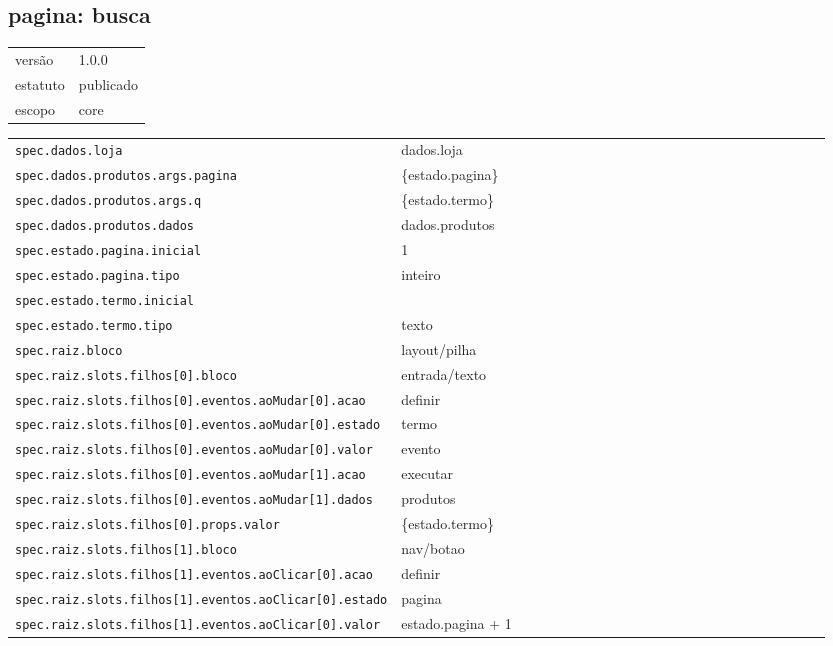 \subsection*{pagina: busca}
\begin{tabular}{@{}ll@{}}
versão & 1.0.0 \\
estatuto & publicado \\
escopo & core \\
\end{tabular}

\begin{tabular}{@{}p{0.35\linewidth}p{0.6\linewidth}@{}}
\texttt{spec.dados.loja} & dados.loja \\
\texttt{spec.dados.produtos.args.pagina} & \{estado.pagina\} \\
\texttt{spec.dados.produtos.args.q} & \{estado.termo\} \\
\texttt{spec.dados.produtos.dados} & dados.produtos \\
\texttt{spec.estado.pagina.inicial} & 1 \\
\texttt{spec.estado.pagina.tipo} & inteiro \\
\texttt{spec.estado.termo.inicial} &  \\
\texttt{spec.estado.termo.tipo} & texto \\
\texttt{spec.raiz.bloco} & layout/pilha \\
\texttt{spec.raiz.slots.filhos[0].bloco} & entrada/texto \\
\texttt{spec.raiz.slots.filhos[0].eventos.aoMudar[0].acao} & definir \\
\texttt{spec.raiz.slots.filhos[0].eventos.aoMudar[0].estado} & termo \\
\texttt{spec.raiz.slots.filhos[0].eventos.aoMudar[0].valor} & evento \\
\texttt{spec.raiz.slots.filhos[0].eventos.aoMudar[1].acao} & executar \\
\texttt{spec.raiz.slots.filhos[0].eventos.aoMudar[1].dados} & produtos \\
\texttt{spec.raiz.slots.filhos[0].props.valor} & \{estado.termo\} \\
\texttt{spec.raiz.slots.filhos[1].bloco} & nav/botao \\
\texttt{spec.raiz.slots.filhos[1].eventos.aoClicar[0].acao} & definir \\
\texttt{spec.raiz.slots.filhos[1].eventos.aoClicar[0].estado} & pagina \\
\texttt{spec.raiz.slots.filhos[1].eventos.aoClicar[0].valor} & estado.pagina + 1 \\

\end{tabular}
